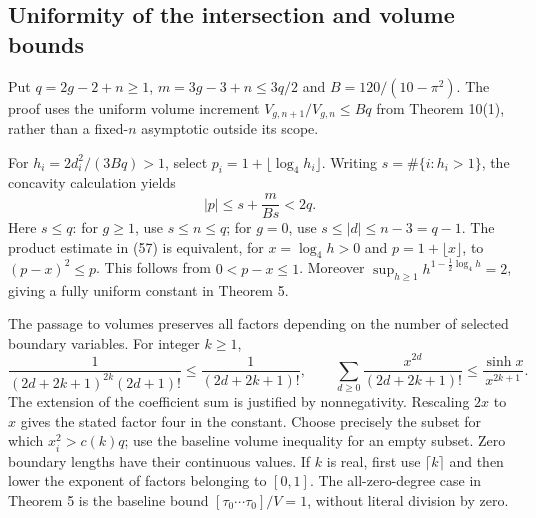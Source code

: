 \documentclass[10pt]{article}
\begin{document}
\subsection*{Uniformity of the intersection and volume bounds}
Put \(q=2g-2+n\ge1\), \(m=3g-3+n\le3q/2\) and \(B=120/(10-\pi^2)\). The proof uses the uniform volume increment \(V_{g,n+1}/V_{g,n}\le Bq\) from Theorem 10(1), rather than a fixed-\(n\) asymptotic outside its scope.\par
For \(h_i=2d_i^2/(3Bq)>1\), select \(p_i=1+\lfloor\log_4h_i\rfloor\). Writing \(s=\#\{i:h_i>1\}\), the concavity calculation yields \[|p|\le s+\frac{m}{Bs}<2q.\] Here \(s\le q\): for \(g\ge1\), use \(s\le n\le q\); for \(g=0\), use \(s\le|d|\le n-3=q-1\). The product estimate in (57) is equivalent, for \(x=\log_4h>0\) and \(p=1+\lfloor x\rfloor\), to \((p-x)^2\le p\). This follows from \(0<p-x\le1\). Moreover \(\sup_{h\ge1}h^{1-\frac12\log_4h}=2\), giving a fully uniform constant in Theorem 5.\par
The passage to volumes preserves all factors depending on the number of selected boundary variables. For integer \(k\ge1\), \[\frac1{(2d+2k+1)^{2k}(2d+1)!}
 \le\frac1{(2d+2k+1)!},
 \qquad
 \sum_{d\ge0}\frac{x^{2d}}{(2d+2k+1)!}
 \le\frac{\sinh x}{x^{2k+1}}.\] The extension of the coefficient sum is justified by nonnegativity. Rescaling \(2x\) to \(x\) gives the stated factor four in the constant. Choose precisely the subset for which \(x_i^2>c(k)q\); use the baseline volume inequality for an empty subset. Zero boundary lengths have their continuous values. If \(k\) is real, first use \(\lceil k\rceil\) and then lower the exponent of factors belonging to \([0,1]\). The all-zero-degree case in Theorem 5 is the baseline bound \([\tau_0\cdots\tau_0]/V=1\), without literal division by zero.\par
\end{document}
